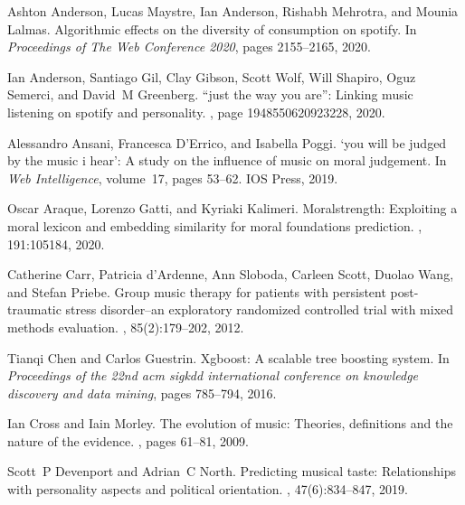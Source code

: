 \documentclass{article}
\begin{document}
% 
%   

\begin{thebibliography}{10}

Ashton Anderson, Lucas Maystre, Ian Anderson, Rishabh Mehrotra, and Mounia
  Lalmas.
\newblock Algorithmic effects on the diversity of consumption on spotify.
\newblock In {\em Proceedings of The Web Conference 2020}, pages 2155--2165,
  2020.

Ian Anderson, Santiago Gil, Clay Gibson, Scott Wolf, Will Shapiro, Oguz
  Semerci, and David~M Greenberg.
\newblock ``just the way you are'': Linking music listening on spotify and
  personality.
, page
  1948550620923228, 2020.

Alessandro Ansani, Francesca D'Errico, and Isabella Poggi.
\newblock `you will be judged by the music i hear': A study on the influence of
  music on moral judgement.
\newblock In {\em Web Intelligence}, volume~17, pages 53--62. IOS Press, 2019.

Oscar Araque, Lorenzo Gatti, and Kyriaki Kalimeri.
\newblock Moralstrength: Exploiting a moral lexicon and embedding similarity
  for moral foundations prediction.
, 191:105184, 2020.

Catherine Carr, Patricia d'Ardenne, Ann Sloboda, Carleen Scott, Duolao Wang,
  and Stefan Priebe.
\newblock Group music therapy for patients with persistent post-traumatic
  stress disorder--an exploratory randomized controlled trial with mixed
  methods evaluation.
,
  85(2):179--202, 2012.

Tianqi Chen and Carlos Guestrin.
\newblock Xgboost: A scalable tree boosting system.
\newblock In {\em Proceedings of the 22nd acm sigkdd international conference
  on knowledge discovery and data mining}, pages 785--794, 2016.

Ian Cross and Iain Morley.
\newblock The evolution of music: Theories, definitions and the nature of the
  evidence.
, pages 61--81, 2009.

Scott~P Devenport and Adrian~C North.
\newblock Predicting musical taste: Relationships with personality aspects and
  political orientation.
, 47(6):834--847, 2019.


\end{thebibliography}
\end{document}
